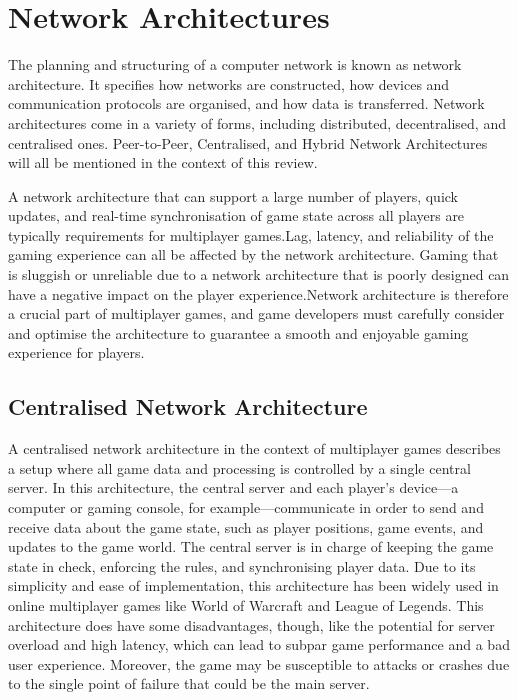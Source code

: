 \section{Network Architectures}

The planning and structuring of a computer network is known as network architecture. It specifies how networks are constructed, how devices and communication protocols are organised, and how data is transferred. Network architectures come in a variety of forms, including distributed, decentralised, and centralised ones. Peer-to-Peer, Centralised, and Hybrid Network Architectures will all be mentioned in the context of this review.\cite{glazer2015multiplayer}\cite{kurose2017computer}

A network architecture that can support a large number of players, quick updates, and real-time synchronisation of game state across all players are typically requirements for multiplayer games.Lag, latency, and reliability of the gaming experience can all be affected by the network architecture.\cite{claypool2006latency} Gaming that is sluggish or unreliable due to a network architecture that is poorly designed can have a negative impact on the player experience.Network architecture is therefore a crucial part of multiplayer games, and game developers must carefully consider and optimise the architecture to guarantee a smooth and enjoyable gaming experience for players.\cite{peterson2011computer}

\subsection{Centralised Network Architecture}

A centralised network architecture in the context of multiplayer games describes a setup where all game data and processing is controlled by a single central server. In this architecture, the central server and each player's device—a computer or gaming console, for example—communicate in order to send and receive data about the game state, such as player positions, game events, and updates to the game world.\cite{zhang2012design}
The central server is in charge of keeping the game state in check, enforcing the rules, and synchronising player data. Due to its simplicity and ease of implementation, this architecture has been widely used in online multiplayer games like World of Warcraft and League of Legends.
This architecture does have some disadvantages, though, like the potential for server overload and high latency, which can lead to subpar game performance and a bad user experience. Moreover, the game may be susceptible to attacks or crashes due to the single point of failure that could be the main server.\cite{zhang2012design}

